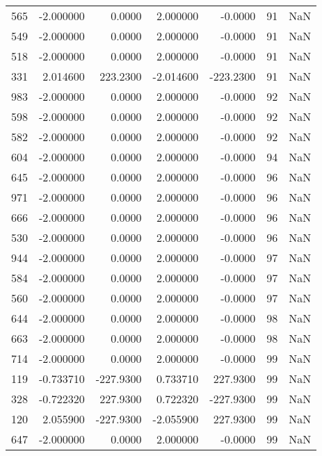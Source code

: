 \begin{tabular}{rrrrrrr}
 565 &   -2.000000 &    0.0000 &    2.000000 &     -0.0000 &          91 & NaN \\
 549 &   -2.000000 &    0.0000 &    2.000000 &     -0.0000 &          91 & NaN \\
 518 &   -2.000000 &    0.0000 &    2.000000 &     -0.0000 &          91 & NaN \\
 331 &    2.014600 &  223.2300 &   -2.014600 &   -223.2300 &          91 & NaN \\
 983 &   -2.000000 &    0.0000 &    2.000000 &     -0.0000 &          92 & NaN \\
 598 &   -2.000000 &    0.0000 &    2.000000 &     -0.0000 &          92 & NaN \\
 582 &   -2.000000 &    0.0000 &    2.000000 &     -0.0000 &          92 & NaN \\
 604 &   -2.000000 &    0.0000 &    2.000000 &     -0.0000 &          94 & NaN \\
 645 &   -2.000000 &    0.0000 &    2.000000 &     -0.0000 &          96 & NaN \\
 971 &   -2.000000 &    0.0000 &    2.000000 &     -0.0000 &          96 & NaN \\
 666 &   -2.000000 &    0.0000 &    2.000000 &     -0.0000 &          96 & NaN \\
 530 &   -2.000000 &    0.0000 &    2.000000 &     -0.0000 &          96 & NaN \\
 944 &   -2.000000 &    0.0000 &    2.000000 &     -0.0000 &          97 & NaN \\
 584 &   -2.000000 &    0.0000 &    2.000000 &     -0.0000 &          97 & NaN \\
 560 &   -2.000000 &    0.0000 &    2.000000 &     -0.0000 &          97 & NaN \\
 644 &   -2.000000 &    0.0000 &    2.000000 &     -0.0000 &          98 & NaN \\
 663 &   -2.000000 &    0.0000 &    2.000000 &     -0.0000 &          98 & NaN \\
 714 &   -2.000000 &    0.0000 &    2.000000 &     -0.0000 &          99 & NaN \\
 119 &   -0.733710 & -227.9300 &    0.733710 &    227.9300 &          99 & NaN \\
 328 &   -0.722320 &  227.9300 &    0.722320 &   -227.9300 &          99 & NaN \\
 120 &    2.055900 & -227.9300 &   -2.055900 &    227.9300 &          99 & NaN \\
 647 &   -2.000000 &    0.0000 &    2.000000 &     -0.0000 &          99 & NaN \\

\end{tabular}
